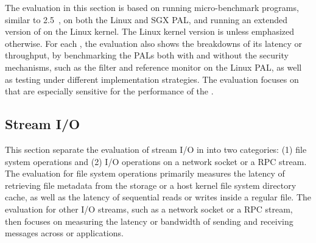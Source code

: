 The evaluation in this section is based on running micro-benchmark programs, similar to \lmbench{} 2.5~\cite{McVoy:lmbench}, on both the Linux and SGX PAL,
and running an extended version of \lmbench{}
on the Linux kernel.
The Linux kernel version is \linuxversion{} unless emphasized otherwise.
For each \hostapis{}, the evaluation also shows the breakdowns
of its latency or throughput,
by benchmarking the PALs both with and without the security mechanisms, such as the \seccomp{} filter and reference monitor on the Linux PAL,
as well as testing under different
implementation strategies.
The evaluation focuses on \hostapis{} that are especially sensitive for the performance of the \graphene{} \libos{}.





\subsection{Stream I/O}

This section separate the evaluation of stream I/O in \thehostabi{} into 
two categories:
(1) file system operations and (2) I/O operations on a network socket or a RPC stream.
The evaluation for file system operations
primarily measures
the latency of retrieving file metadata from the storage or a host kernel file system directory cache,
as well as the latency of sequential reads or writes
inside a regular file.
The evaluation for other I/O streams, such as a network socket or a RPC stream,
then focuses on measuring the latency or bandwidth
of sending and receiving messages 
across \picoprocs{} or applications.







